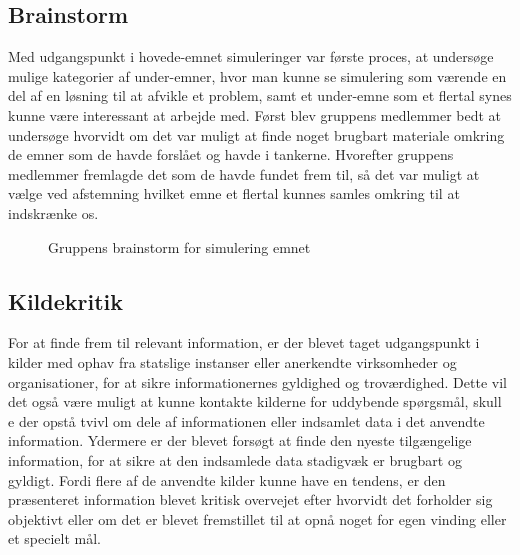\subsection{Brainstorm}
Med udgangspunkt i hovede-emnet simuleringer var første proces, at undersøge mulige kategorier af under-emner, hvor man kunne se simulering som værende en del af en løsning til at afvikle et problem, samt et under-emne som et flertal synes kunne være interessant at arbejde med. Først blev gruppens medlemmer bedt at undersøge hvorvidt om det var muligt at finde noget brugbart materiale omkring de emner som de havde forslået og havde i tankerne. Hvorefter gruppens medlemmer fremlagde det som de havde fundet frem til, så det var muligt at vælge ved afstemning hvilket emne et flertal kunnes samles omkring til at indskrænke os. 

\begin{figure}[H]
    \centering
    \caption{Gruppens brainstorm for simulering emnet}
    \label{Simulering_Brainstorm}
\end{figure}

\subsection{Kildekritik}
For at finde frem til relevant information, er der blevet taget udgangspunkt i kilder med ophav fra statslige instanser eller anerkendte virksomheder og organisationer, for at sikre informationernes gyldighed og troværdighed. Dette vil det også være muligt at kunne kontakte kilderne for uddybende spørgsmål, skull
e der opstå tvivl om dele af informationen eller indsamlet data i det anvendte information. Ydermere er der blevet forsøgt at finde den nyeste tilgængelige information, for at sikre at den indsamlede data stadigvæk er brugbart og gyldigt. Fordi flere af de anvendte kilder kunne have en tendens, er den præsenteret information blevet kritisk overvejet efter hvorvidt det forholder sig objektivt eller om det er blevet fremstillet til at opnå noget for egen vinding eller et specielt mål.

